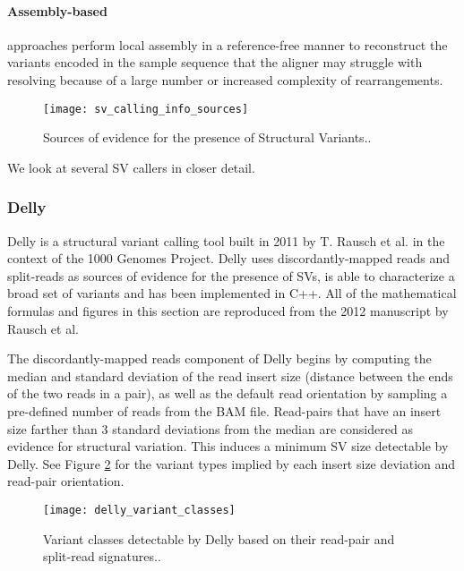 \paragraph{Assembly-based} approaches perform local assembly in a reference-free manner to reconstruct the variants encoded in the sample sequence that the aligner may struggle with resolving because of a large number or increased complexity of rearrangements.

\begin{figure}[H]
    \texttt{[image: sv\_calling\_info\_sources]}
    \centering
    \caption {Sources of evidence for the presence of Structural Variants.\autocite{zhao2013computational}.}
    \label{fig:sv_calling_info_sources}
\end{figure}

We look at several SV callers in closer detail.

\subsubsection{Delly}

Delly\autocite{rausch2012delly} is a structural variant calling tool built in 2011 by T. Rausch et al. in the context of the 1000 Genomes Project. Delly uses discordantly-mapped reads and split-reads as sources of evidence for the presence of SVs, is able to characterize a broad set of variants and has been implemented in C++. All of the mathematical formulas and figures in this section are reproduced from the 2012 manuscript by Rausch et al.

The discordantly-mapped reads component of Delly begins by computing the median and standard deviation of the read insert size (distance between the ends of the two reads in a pair), as well as the default read orientation by sampling a pre-defined number of reads from the BAM file. Read-pairs that have an insert size farther than 3 standard deviations from the median are considered as evidence for structural variation. This induces a minimum SV size detectable by Delly. See Figure \ref{fig:delly_variant_classes} for the variant types implied by each insert size deviation and read-pair orientation.

\begin{figure}[H]
    \texttt{[image: delly\_variant\_classes]}
    \centering
    \caption {Variant classes detectable by Delly based on their read-pair and split-read signatures.\autocite{rausch2012delly}.}
    \label{fig:delly_variant_classes}
\end{figure}

